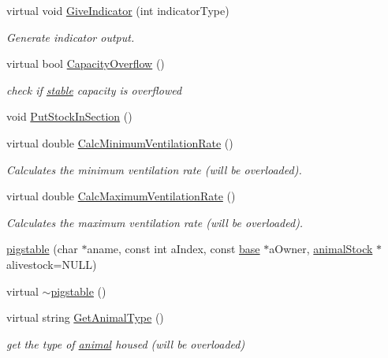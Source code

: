 \begin{DoxyCompactItemize}
virtual void \hyperlink{classpigstable_a55806be52263692f12d10870d9ee86eb}{GiveIndicator} (int indicatorType)
\begin{DoxyCompactList}\small\item\em Generate indicator output. \item\end{DoxyCompactList}\item 
virtual bool \hyperlink{classpigstable_ab741568ab92b4d23205c5c19c749b574}{CapacityOverflow} ()
\begin{DoxyCompactList}\small\item\em check if \hyperlink{classstable}{stable} capacity is overflowed \item\end{DoxyCompactList}\item 
void \hyperlink{classpigstable_ab314ba2d59e6a782d7bf8dcd5a367a0a}{PutStockInSection} ()
\item 
virtual double \hyperlink{classpigstable_ae93e1ef050422ae6e4e156b888a56330}{CalcMinimumVentilationRate} ()
\begin{DoxyCompactList}\small\item\em Calculates the minimum ventilation rate (will be overloaded). \item\end{DoxyCompactList}\item 
virtual double \hyperlink{classpigstable_a8b3e2aff62122c23b6b6e95829731b80}{CalcMaximumVentilationRate} ()
\begin{DoxyCompactList}\small\item\em Calculates the maximum ventilation rate (will be overloaded). \item\end{DoxyCompactList}\item 
\hyperlink{classpigstable_a364d33fa370fb478387009b95dae4cea}{pigstable} (char $\ast$aname, const int aIndex, const \hyperlink{classbase}{base} $\ast$aOwner, \hyperlink{classanimal_stock}{animalStock} $\ast$alivestock=NULL)
\item 
virtual \hyperlink{classpigstable_a6295ed8b464d850128818d052a29bcb7}{$\sim$pigstable} ()
\item 
virtual string \hyperlink{classpigstable_a1078430122dd7afe16b4294b9b969467}{GetAnimalType} ()
\begin{DoxyCompactList}\small\item\em get the type of \hyperlink{classanimal}{animal} housed (will be overloaded) \item\end{DoxyCompactList}\item 

\end{DoxyCompactItemize}
